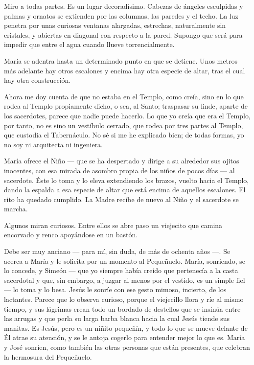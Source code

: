 \documentclass[12pt, twoside, openright]{book} %
\begin{document}
Miro a todas partes. Es un lugar decoradísimo. Cabezas de ángeles esculpidas y palmas y ornatos se extienden por las columnas, las paredes y el techo. La luz penetra por unas curiosas ventanas alargadas, estrechas, naturalmente sin cristales, y abiertas en diagonal con respecto a la pared. Supongo que será para impedir que entre el agua cuando llueve torrencialmente. 

María se adentra hasta un determinado punto en que se detiene. Unos metros más adelante hay otros escalones y encima hay otra especie de altar, tras el cual hay otra construcción. 

Ahora me doy cuenta de que no estaba en el Templo, como creía, sino en lo que rodea al Templo propiamente dicho, o sea, al Santo; traspasar su linde, aparte de los sacerdotes, parece que nadie puede hacerlo. Lo que yo creía que era el Templo, por tanto, no es sino un vestíbulo cerrado, que rodea por tres partes al Templo, que custodia el Tabernáculo. No sé si me he explicado bien; de todas formas, yo no soy ni arquitecta ni ingeniera. 

María ofrece el Niño — que se ha despertado y dirige a su alrededor sus ojitos inocentes, con esa mirada de asombro propia de los niños de pocos días — al sacerdote. Éste lo toma y lo eleva extendiendo los brazos, vuelto hacia el Templo, dando la espalda a esa especie de altar que está encima de aquellos escalones. El rito ha quedado cumplido. La Madre recibe de nuevo al Niño y el sacerdote se marcha. 

Algunos miran curiosos. Entre ellos se abre paso un viejecito que camina encorvado y renco apoyándose en un bastón. 

Debe ser muy anciano — para mí, sin duda, de más de ochenta años —. Se acerca a María y le solicita por un momento al Pequeñuelo. María, sonriendo, se lo concede, y Simeón — que yo siempre había creído que pertenecía a la casta sacerdotal y que, sin embargo, a juzgar al menos por el vestido, es un simple fiel — lo toma y lo besa. Jesús le sonríe con ese gesto mimoso, incierto, de los lactantes. Parece que lo observa curioso, porque el viejecillo llora y ríe al mismo tiempo, y sus lágrimas crean todo un bordado de destellos que se insinúa entre las arrugas y que perla su larga barba blanca hacia la cual Jesús tiende sus manitas. Es Jesús, pero es un niñito pequeñín, y todo lo que se mueve delante de Él atrae su atención, y se le antoja cogerlo para entender mejor lo que es. María y José sonríen, como también las otras personas que están presentes, que celebran la hermosura del Pequeñuelo. 
\end{document}
